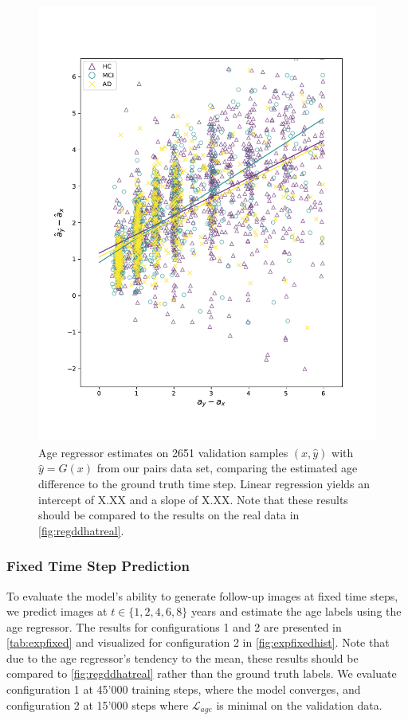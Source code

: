 \begin{figure}[p]
	\centering
	\includegraphics[width=.7\linewidth]{images/age_plots/d_dhat_fake}
	\vspace*{-15pt}
	\caption{Age regressor estimates on 2651 validation samples $(x, \hat y)$ with $ \hat y = G(x) $ from our pairs data set, comparing the estimated age difference to the ground truth time step. Linear regression yields an intercept of X.XX and a slope of X.XX. Note that these results should be compared to the results on the real data in \autoref{fig:regddhatreal}.}
	\label{fig:regddhatfake}
\end{figure}

\subsubsection*{Fixed Time Step Prediction}
To evaluate the model's ability to generate follow-up images at fixed time steps, we predict images at $t \in \{1, 2, 4, 6, 8\}$ years and estimate the age labels using the age regressor. The results for configurations 1 and 2 are presented in \autoref{tab:expfixed} and visualized for configuration 2 in \autoref{fig:expfixedhist}. Note that due to the age regressor's tendency to the mean, these results should be compared to \autoref{fig:regddhatreal} rather than the ground truth labels. We evaluate configuration 1 at 45'000 training steps, where the model converges, and configuration 2 at 15'000 steps where $\mathcal{L}_{age}$ is minimal on the validation data. 

